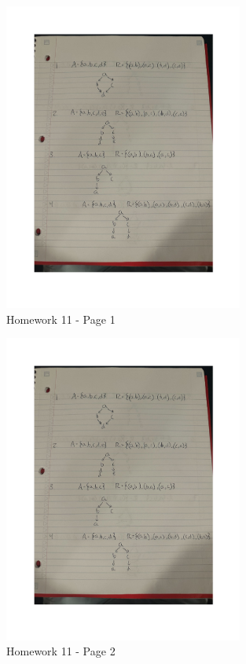 \documentclass{article}
\theoremstyle{plain}
\theoremstyle{definition}
\theoremstyle{remark}
\begin{document}
\begin{figure}[H]
  \centering
  \includegraphics[width=0.7\textwidth, page=1]{img/HW11.pdf}
  \caption{Homework 11 - Page 1}
  \label{fig:homework11_page1}
\end{figure}

\begin{figure}[H]
  \centering
  \includegraphics[width=0.7\textwidth, page=2]{img/HW11.pdf}
  \caption{Homework 11 - Page 2}
  \label{fig:homework11_page2}
\end{figure}
\end{document}
